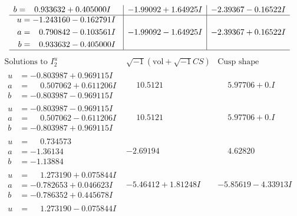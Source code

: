 \documentclass[1p]{elsarticle_modified}
\theoremstyle{definition}
\newcommand{\I}{\sqrt{-1}}
\begin{document}
$$\begin{array}{c|c|c}
\begin{aligned}
b &= \phantom{-}0.933632 + 0.405000 I\end{aligned}
 & -1.99092 + 1.64925 I & -2.39367 - 0.16522 I \\ \hline\begin{aligned}
u &= -1.243160 - 0.162791 I \\
a &= \phantom{-}0.790842 - 0.103561 I \\
b &= \phantom{-}0.933632 - 0.405000 I\end{aligned}
 & -1.99092 - 1.64925 I & -2.39367 + 0.16522 I\\
 \hline 
 \end{array}$$\newpage$$\begin{array}{c|c|c}  
\text{Solutions to }I^u_{2}& \I (\text{vol} + \sqrt{-1}CS) & \text{Cusp shape}\\
 \hline 
\begin{aligned}
u &= -0.803987 + 0.969115 I \\
a &= \phantom{-}0.507062 + 0.611206 I \\
b &= -0.803987 - 0.969115 I\end{aligned}
 & \phantom{-}10.5121\phantom{ +0.000000I} & \phantom{-}5.97706 + 0. I\phantom{ +0.000000I} \\ \hline\begin{aligned}
u &= -0.803987 - 0.969115 I \\
a &= \phantom{-}0.507062 - 0.611206 I \\
b &= -0.803987 + 0.969115 I\end{aligned}
 & \phantom{-}10.5121\phantom{ +0.000000I} & \phantom{-}5.97706 + 0. I\phantom{ +0.000000I} \\ \hline\begin{aligned}
u &= \phantom{-}0.734573\phantom{ +0.000000I} \\
a &= -1.36134\phantom{ +0.000000I} \\
b &= -1.13884\phantom{ +0.000000I}\end{aligned}
 & -2.69194\phantom{ +0.000000I} & \phantom{-}4.62820\phantom{ +0.000000I} \\ \hline\begin{aligned}
u &= \phantom{-}1.273190 + 0.075844 I \\
a &= -0.782653 + 0.046623 I \\
b &= -0.786352 + 0.445678 I\end{aligned}
 & -5.46412 + 1.81248 I & -5.85619 - 4.33913 I \\ \hline\begin{aligned}
u &= \phantom{-}1.273190 - 0.075844 I \\

\end{aligned}
\end{array}$$
\end{document}
